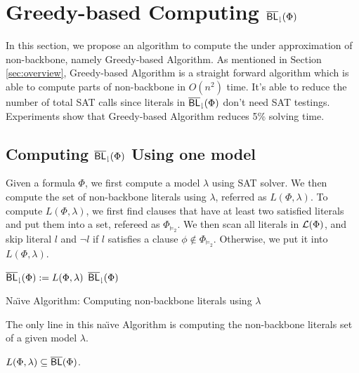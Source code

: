 \section{Greedy-based Computing ${\sf \overline{BL}_\downharpoonright}(\Phi)$} \label{sec:greedy}
In this section, we propose an algorithm to compute the under approximation of non-backbone, namely Greedy-based Algorithm. As mentioned in Section \ref{sec:overview}, Greedy-based Algorithm is a straight forward algorithm which is able to compute parts of non-backbone in $O(n^2)$ time. It's able to reduce the number of total SAT calls since literals in ${\sf \overline{BL}_\downharpoonright}(\Phi)$ don't need SAT testings. Experiments show that Greedy-based Algorithm reduces 5\% solving time.

\subsection{Computing ${\sf \overline{BL}_\downharpoonright}(\Phi)$ Using one model}

Given a formula $\Phi$, we first compute a model $\lambda$ using SAT solver. We then compute the set of non-backbone literals using $\lambda$, referred as $L(\Phi,\lambda)$.
To compute $L(\Phi,\lambda)$, we first find clauses that have at least two satisfied literals and put them into a set, refereed as $\Phi_{\models_2}$. We then scan all literals in $\Lit(\Phi)$, and skip literal $l$ and $\neg l$ if $l$ satisfies a clause $\phi\notin\Phi_{\models_2}$. Otherwise, we put it into $L(\Phi,\lambda)$.

\begin{algorithm2e}
\SetAlgoShortEnd
\SetFillComment
{}
${\sf \overline{BL}_\downharpoonright}(\Phi):=L(\Phi,\lambda)$\;
\Return ${\sf \overline{BL}_\downharpoonright}(\Phi)$\;
\caption{Na\"{\i}ve Algorithm: Computing non-backbone literals using $\lambda$}
\label{alg:greedy}
\end{algorithm2e}

The only line in this na\"{\i}ve Algorithm is computing the non-backbone literals set of a given model $\lambda$.

\begin{theorem} \label{lem:navie}
 $L(\Phi,\lambda)\subseteq\overline{\textsf{BL}}(\Phi)$.
\end{theorem}

